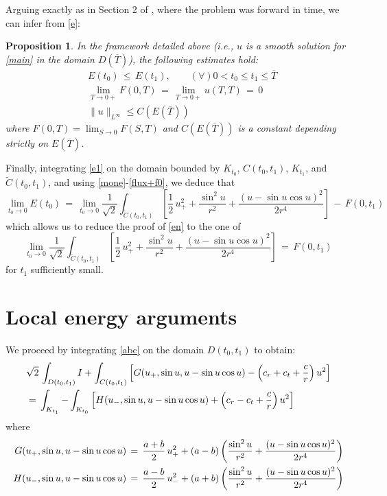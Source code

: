 \documentclass{amsart}
\newtheorem{prop}[theorem]{Proposition}
\begin{document}
Arguing exactly as in Section 2 of \cite{GR1}, where the problem was forward in time, we can infer from \eqref{e}:

\begin{prop}
In the framework detailed above (i.e., $u$ is a smooth solution for \eqref{main} in the domain $D(\overline{T})$), the following estimates hold:
\begin{align}
&E(t_0)\,\leq\, E(t_1), \qquad (\forall) 0< t_0\leq t_1 \leq
\overline{T} \label{mone}\\
&\lim_{T\to 0+}F(0,T)\,=\,\lim_{T\to 0+} u(T,T)\,=\,0
\label{flux+f0}\\
&\|u\|_{L^\infty}\leq C(E(\overline{T})) \label{li}
\end{align}
where $F(0,T)=\lim_{S\to 0} F(S,T)$ and $C(E(\overline{T})) $ is a constant depending strictly on $E(\overline{T})$.
\label{old}\end{prop}

Finally, integrating \eqref{e1} on the domain bounded by $K_{t_0}$, $C(t_0,t_1)$, $K_{t_1}$, and $\tilde{C}(t_0,t_1)$, and using \eqref{mone}-\eqref{flux+f0}, we deduce that
\[
\lim_{t_0\to 0} E(t_0) \,=\,\lim_{t_0\to 0} \frac{1}{\sqrt 2}\int_{\tilde{C}(t_0,t_1)}
\left[\frac{1}{2}\,u_+^2+\frac{\sin^2u}{r^2}+\frac{(u-\sin u \cos
u)^2}{2r^4}\right]\,-\,F(0,t_1)\]
which allows us to reduce the proof of \eqref{en} to the one of
\begin{equation}
\lim_{t_0\to 0} \frac{1}{\sqrt 2}\int_{\tilde{C}(t_0,t_1)}
\left[\frac{1}{2}\,u_+^2+\frac{\sin^2u}{r^2}+\frac{(u-\sin u \cos
u)^2}{2r^4}\right]\,=\,F(0,t_1)\label{lim}
\end{equation}
for $t_1$ sufficiently small.

\section{Local energy arguments}
We proceed by integrating \eqref{abc} on the domain $D(t_0,t_1)$ to obtain:
\begin{equation}
\aligned &\sqrt 2\,\int_{D(t_0,t_1)} I + \int_{C(t_0,t_1)} \left[ G(u_+, \sin u, u-\sin u \cos u)-\left(c_r+c_t+\frac{c}{r}\right)u^2\right]\\
&=\,\int_{K_{t_1}} - \int_{K_{t_0}} \left[ H(u_-, \sin u, u-\sin u \cos u)+\left(c_r-c_t+\frac{c}{r}\right)u^2\right]\\
\endaligned\label{int}
\end{equation}
where
\[
\aligned
G(u_+, \sin u, u-\sin u \cos u)\,&=\,\frac{a+b}{2}\, u_{+}^2+
(a-b)\left(\frac{\sin^2u}{r^2}+\frac{(u-\sin u \cos
u)^2}{2r^4}\right)\\
H(u_-, \sin u, u-\sin u \cos u)\,&=\,\frac{a-b}{2}\, u_{-}^2+
(a+b)\left(\frac{\sin^2u}{r^2}+\frac{(u-\sin u \cos
u)^2}{2r^4}\right)\endaligned
\]
\end{document}
